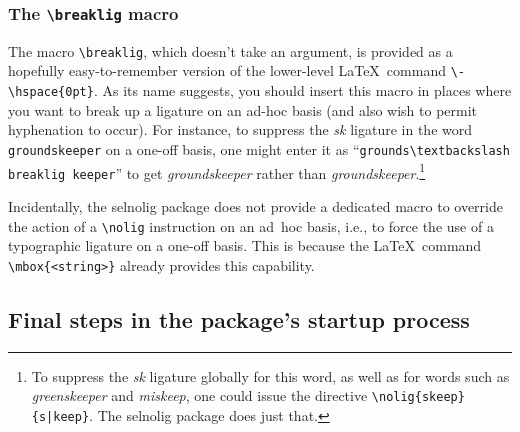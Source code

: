\documentclass[11pt]{article}
\newcommand{\pkg}[1]{\textsf{#1}}
\newcommand{\cmmd}[1]{\texttt{\textbackslash #1}}
\begin{document}
\subsubsection{The \cmmd{breaklig} macro} 
\label{sec:breaklig}

The macro \cmmd{breaklig}, which doesn't take an argument, is provided as a hopefully easy-to-remember version of the lower-level \LaTeX\ command \Verb+\-\hspace{0pt}+. As its name suggests, you should insert this macro in places where you want to break up a ligature on an ad-hoc basis (and also wish to permit hyphenation to occur). For instance, to suppress the \emph{\mbox{sk}} ligature in the word \Verb+groundskeeper+ on a one-off basis, one might enter it as \enquote{\Verb+grounds\textbackslash breaklig keeper+} to get \emph{\ebg groundskeeper} rather than \emph{\ebg ground\mbox{sk}eeper}.\footnote{To suppress the {\ebg \emph{\mbox{sk}}} ligature globally for this word, as well as for words such as \emph{\ebg greenskeeper} and \emph{\ebg miskeep}, one could issue the directive \Verb+\nolig{skeep}{s|keep}+. The \pkg{selnolig} package does just that.}


Incidentally, the \pkg{selnolig} package does not provide a dedicated macro to override the action of a \cmmd{nolig} instruction on an ad~hoc basis, i.e., to force the use of a typographic ligature on a one-off basis. This is because the \LaTeX\ command \Verb+\mbox{<string>}+ already provides this capability.


\subsection{Final steps in the package's startup process}
\end{document}
